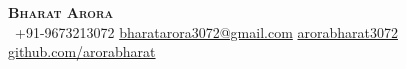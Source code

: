 \begin{center}
    \textbf{\Huge \scshape Bharat Arora} \\ \vspace{1pt}
     \ \small +91-9673213072 \quad
    \href{mailto:fibharatarora3072stlast@gmail.com}{ bharatarora3072@gmail.com} \quad
    \href{https://www.linkedin.com/in/arorabharat3072}{ arorabharat3072} \quad
    \href{https://github.com/arorabharat}{ github.com/arorabharat}
\end{center}